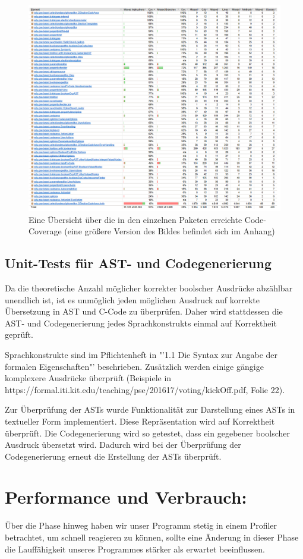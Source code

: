 \documentclass[a4paper]{scrreprt}
\begin{document}
\begin{figure}[ht]
	\centering
  \includegraphics[width=1.0\textwidth,
  height=0.40\textwidth]{images/Coverage.png} \caption{Eine Übersicht über die
  in den einzelnen Paketen erreichte Code-Coverage (eine größere Version des
  Bildes befindet sich im Anhang)}
	\label{coverage}
\end{figure}



\section{Unit-Tests für AST- und Codegenerierung}
Da die theoretische Anzahl möglicher korrekter boolscher Ausdrücke abzählbar unendlich ist, ist es unmöglich jeden möglichen Ausdruck auf korrekte Übersetzung in AST und C-Code zu überprüfen. Daher wird stattdessen die AST- und Codegenerierung jedes Sprachkonstrukts einmal auf Korrektheit geprüft. 

Sprachkonstrukte sind im Pflichtenheft in "'1.1 Die Syntax zur Angabe der formalen Eigenschaften"' beschrieben. Zusätzlich werden einige gängige komplexere Ausdrücke überprüft (Beispiele in https://formal.iti.kit.edu/teaching/pse/201617/voting/kickOff.pdf, Folie 22). 

Zur Überprüfung der ASTs wurde Funktionalität zur Darstellung eines ASTs in textueller Form implementiert. Diese Repräsentation wird auf Korrektheit überprüft. Die Codegenerierung wird so getestet, dass ein gegebener boolscher Ausdruck übersetzt wird. Dadurch wird bei der Überprüfung der Codegenerierung erneut die Erstellung der ASTs überprüft. 

\chapter{Performance und Verbrauch:}
Über die Phase hinweg haben wir unser Programm stetig in einem Profiler betrachtet, um
schnell reagieren zu können, sollte eine Änderung in dieser Phase die
Lauffähigkeit unseres Programmes stärker als erwartet beeinflussen.
\end{document}
